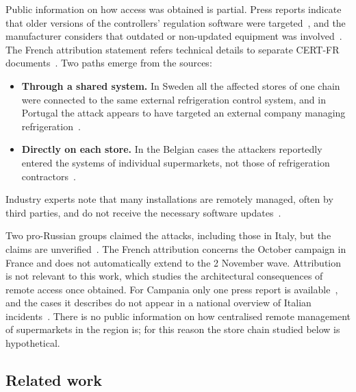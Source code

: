 \documentclass{ceurart}
\begin{document}
Public information on how access was obtained is partial.
Press reports indicate that older versions of the controllers' regulation software were targeted~\cite{fatto2026francia}, and the manufacturer considers that outdated or non-updated equipment was involved~\cite{lmi2026danfoss}.
The French attribution statement refers technical details to separate CERT-FR documents~\cite{anssi2026attribution,certfr2026cti009}.
Two paths emerge from the sources:
\begin{itemize}
  \item \textbf{Through a shared system.} In Sweden all the affected stores of one chain were connected to the same external refrigeration control system, and in Portugal the attack appears to have targeted an external company managing refrigeration~\cite{thn2026wave}.
  \item \textbf{Directly on each store.} In the Belgian cases the attackers reportedly entered the systems of individual supermarkets, not those of refrigeration contractors~\cite{thn2026wave}.
\end{itemize}
Industry experts note that many installations are remotely managed, often by third parties, and do not receive the necessary software updates~\cite{aljazeera2026coldwar}.

Two pro-Russian groups claimed the attacks, including those in Italy, but the claims are unverified~\cite{punto2026claims}.
The French attribution concerns the October campaign in France and does not automatically extend to the 2 November wave.
Attribution is not relevant to this work, which studies the architectural consequences of remote access once obtained.
For Campania only one press report is available~\cite{fanpage2026napoli}, and the cases it describes do not appear in a national overview of Italian incidents~\cite{cyber360cases2026}.
There is no public information on how centralised remote management of supermarkets in the region is; for this reason the store chain studied below is hypothetical.

\subsection{Related work}
\end{document}
